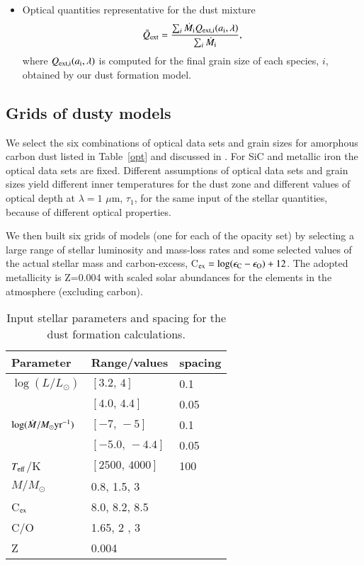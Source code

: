 \documentclass[useAMS,usenatbib]{mn2e/mn2e}
\begin{document}
\begin{itemize}
\item Optical quantities representative for the dust mixture
\begin{equation}\label{av_Qext}
\bar{Q}_{\rm ext}=\frac{\sum_i \dot{M}_{\rm i} Q_{\rm ext, i}(a_{\rm i}, \lambda)}{\sum_i \dot{M}_{\rm i}},
\end{equation}
%
where $Q_{\rm ext, i}(a_{\rm i}, \lambda)$ is computed for the final grain size of each species, $i$, obtained by our dust formation model. 
\end{itemize}

\subsection{Grids of dusty models}
We select the six combinations of optical data sets and grain sizes for amorphous carbon dust listed in Table~\ref{opt} and discussed in \citet{Nanni16}. For SiC and metallic iron the optical data sets are fixed.
Different assumptions of optical data sets and grain sizes yield different inner temperatures for the dust zone and different values of optical depth at $\lambda=1$ $\mu$m, $\tau_1$, for the same input of the stellar quantities, because of different optical properties.

We then built six grids of models (one for each of the opacity set) by selecting a large range of stellar luminosity and mass-loss rates and some selected values of the actual stellar mass and carbon-excess, C$_{\rm ex}=\log(\epsilon_{\rm C}-\epsilon_{\rm O})+12$. The adopted metallicity is Z=0.004 with scaled solar abundances for the elements in the atmosphere (excluding carbon).

\begin{table}
\begin{center}
\caption{Input stellar parameters and spacing for the dust formation calculations.}
\label{Table:grid}
\begin{tabular}{l l l }
\hline
Parameter  &  Range/values  & spacing \\
\hline
$\log(L/L_\odot)$  & $[3.2,\,4]$  & 0.1   \\
                   & $[4.0,\, 4.4]$  & 0.05  \\
$\log(\dot{M}/M_{\odot} {\rm yr}^{-1})$    & $[-7,\, -5]$  & 0.1  \\
                   &  $[-5.0,\, -4.4]$ &  0.05  \\
$T_{\rm eff}$/K    &  $[2500,\,4000]$ & 100   \\
$M/M_{\odot}$     & 0.8, 1.5, 3  & \\
C$_{\rm ex}$ & 8.0, 8.2, 8.5  & \\
 C/O & 1.65, 2 , 3  & \\
Z &   0.004 &  \\
\hline
\end{tabular}
\end{center}
\end{table}
\end{document}
